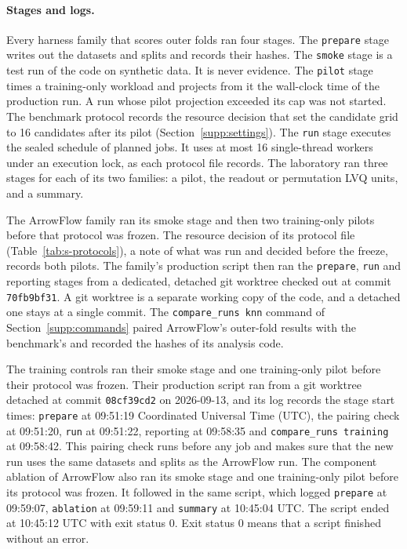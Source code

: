 \paragraph{Stages and logs.} Every harness family that scores outer folds ran four stages. The \texttt{prepare} stage writes out the datasets and splits and records their hashes. The \texttt{smoke} stage is a test run of the code on synthetic data. It is never evidence. The \texttt{pilot} stage times a training-only workload and projects from it the wall-clock time of the production run. A run whose pilot projection exceeded its cap was not started. The benchmark protocol records the resource decision that set the candidate grid to 16 candidates after its pilot (Section~\ref{supp:settings}). The \texttt{run} stage executes the sealed schedule of planned jobs. It uses at most 16 single-thread workers under an execution lock, as each protocol file records. The laboratory ran three stages for each of its two families: a pilot, the readout or permutation LVQ units, and a summary.

The ArrowFlow family ran its smoke stage and then two training-only pilots before that protocol was frozen. The resource decision of its protocol file (Table~\ref{tab:s-protocols}), a note of what was run and decided before the freeze, records both pilots. The family's production script then ran the \texttt{prepare}, \texttt{run} and reporting stages from a dedicated, detached git worktree checked out at commit \texttt{70fb9bf31}. A git worktree is a separate working copy of the code, and a detached one stays at a single commit. The \texttt{compare\_runs knn} command of Section~\ref{supp:commands} paired ArrowFlow's outer-fold results with the benchmark's and recorded the hashes of its analysis code.

The training controls ran their smoke stage and one training-only pilot before their protocol was frozen. Their production script ran from a git worktree detached at commit \texttt{08cf39cd2} on 2026-09-13, and its log records the stage start times: \texttt{prepare} at 09:51:19 Coordinated Universal Time (UTC), the pairing check at 09:51:20, \texttt{run} at 09:51:22, reporting at 09:58:35 and \texttt{compare\_runs training} at 09:58:42. This pairing check runs before any job and makes sure that the new run uses the same datasets and splits as the ArrowFlow run. The component ablation of ArrowFlow also ran its smoke stage and one training-only pilot before its protocol was frozen. It followed in the same script, which logged \texttt{prepare} at 09:59:07, \texttt{ablation} at 09:59:11 and \texttt{summary} at 10:45:04 UTC. The script ended at 10:45:12 UTC with exit status 0. Exit status 0 means that a script finished without an error.

